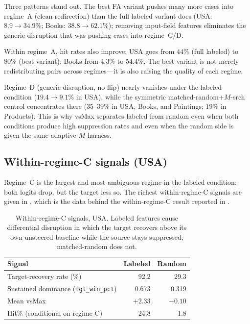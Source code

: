 Three patterns stand out. The best FA variant pushes many more cases into regime~A (clean redirection) than the full labeled variant does (USA: $8.9 \to 34.9\%$; Books: $38.8 \to 62.1\%$); removing input-field features eliminates the generic disruption that was pushing cases into regime~C/D.

Within regime~A, hit rates also improve: USA goes from $44\%$ (full labeled) to $80\%$ (best variant); Books from $4.3\%$ to $54.4\%$. The best variant is not merely redistributing pairs across regimes---it is also raising the quality of each regime.

Regime~D (generic disruption, no flip) nearly vanishes under the labeled condition ($19.4 \to 9.1\%$ in USA), while the symmetric matched-random+$M$-srch control concentrates there ($35$--$39\%$ in USA, Books, and Paintings; $19\%$ in Products). This is why vsMax separates labeled from random even when both conditions produce high suppression rates and even when the random side is given the same adaptive-$M$ harness.

\subsection{Within-regime-C signals (USA)}
Regime~C is the largest and most ambiguous regime in the labeled condition: both logits drop, but the target less so. The richest within-regime-C signals are given in , which is the data behind the within-regime-C result reported in .

\begin{table}[h]
\centering\small
\begin{tabular}{lrr}
\toprule
Signal & Labeled & Random \\
\midrule
Target-recovery rate (\%)      & 92.2 & 29.3 \\
Sustained dominance (\texttt{tgt\_win\_pct}) & 0.673 & 0.319 \\
Mean vsMax                     & $+2.33$ & $-0.10$ \\
Hit\% (conditional on regime C) & 24.8 & 1.8 \\
\bottomrule
\end{tabular}
\caption{Within-regime-C signals, USA. Labeled features cause differential disruption in which the target recovers above its own unsteered baseline while the source stays suppressed; matched-random does not.}
\label{tab:regime-c-usa}
\end{table}

